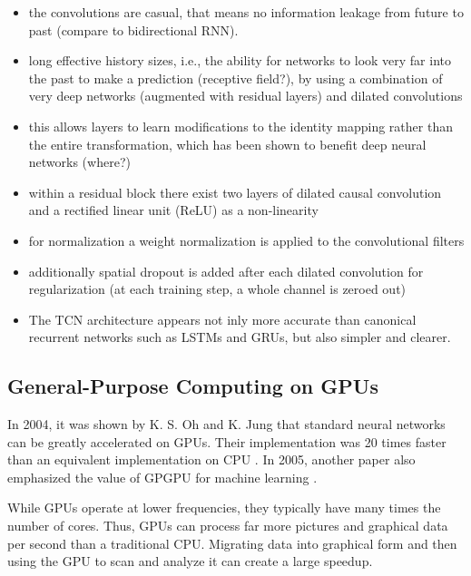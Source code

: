 \documentclass{scrartcl}
\begin{document}
\begin{itemize}
\item the convolutions are casual, that means no information leakage from future to past (compare to bidirectional RNN).
\item long effective history sizes, i.e., the ability for networks to look very far into the past to make a prediction (receptive field?), by using a combination of very deep networks (augmented with residual layers) and dilated convolutions 
\item this allows layers to learn modifications to the identity mapping rather than the entire transformation, which has been shown to benefit deep neural networks (where?)
\item within a residual block there exist two layers of dilated causal convolution and a rectified linear unit (ReLU) \cite{Nair2010} as a non-linearity
\item for normalization a weight normalization \cite{Salimans2016} is applied to the convolutional filters 
\item additionally spatial dropout \cite{Srivastava2014} is added after each dilated convolution for regularization (at each training step, a whole channel is zeroed out)
\item The TCN architecture appears not inly more accurate than canonical recurrent networks such as LSTMs and GRUs, but also simpler and clearer.
\end{itemize}






\subsection{General-Purpose Computing on GPUs} 

In 2004, it was shown by K. S. Oh and K. Jung that standard neural networks can be greatly accelerated on GPUs. Their implementation was 20 times faster than an equivalent implementation on CPU \cite{Oh2004}. In 2005, another paper also emphasized the value of GPGPU for machine learning \cite{Steinkraus2005}.

While GPUs operate at lower frequencies, they typically have many times the number of cores. Thus, GPUs can process far more pictures and graphical data per second than a traditional CPU. Migrating data into graphical form and then using the GPU to scan and analyze it can create a large speedup.


\newpage
\end{document}
